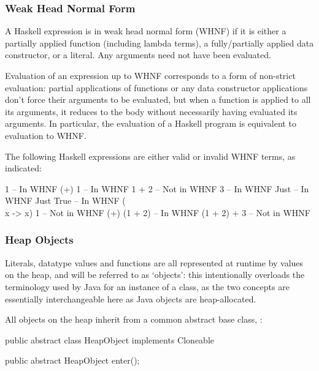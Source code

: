\documentclass[dissertation.tex]{subfiles}
\begin{document}
{{        \subsubsection{Weak Head Normal Form}
        {

            A Haskell expression is in weak head normal form (WHNF) if it is either a partially applied function
            (including lambda terms), a fully/partially applied data constructor, or a literal. Any arguments need not
            have been evaluated.
            
            Evaluation of an expression up to WHNF corresponds to a form of non-strict evaluation: partial applications
            of functions or any data constructor applications don't force their arguments to be evaluated, but when a
            function is applied to all its arguments, it reduces to the body without necessarily having evaluated its
            arguments. In particular, the evaluation of a Haskell program is equivalent to evaluation to WHNF.

            The following Haskell expressions are either valid or invalid WHNF terms, as indicated:

            \begin{haskellfigure}
            1               -- In WHNF
            (+) 1           -- In WHNF
            1 + 2           -- Not in WHNF
            3               -- In WHNF
            Just            -- In WHNF
            Just True       -- In WHNF
            (\\x -> x) 1    -- Not in WHNF
            (+) (1 + 2)     -- In WHNF
            (1 + 2) + 3     -- Not in WHNF
            \end{haskellfigure}
        }
        \subsubsection{Heap Objects}
        {

            Literals, datatype values and functions are all represented at runtime by values on the heap, and will be
            referred to as `objects': this intentionally overloads the terminology used by Java for an instance of a
            class, as the two concepts are essentially interchangeable here as Java objects are heap-allocated.

            All objects on the heap inherit from a common abstract base class, :

            \begin{javafigure}
            public abstract class HeapObject implements Cloneable {
                public abstract HeapObject enter();

}
\end{javafigure}}}}
\end{document}
